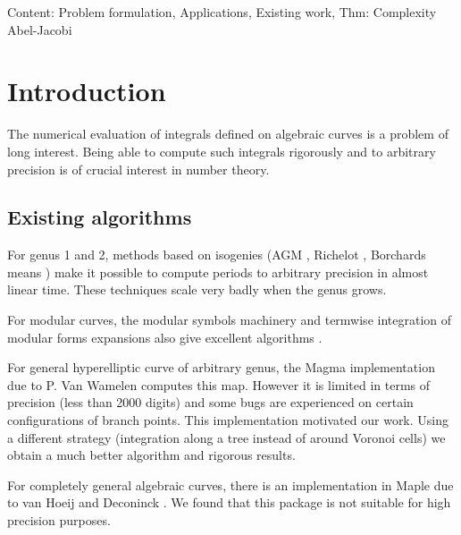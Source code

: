 \documentclass[main.tex]{subfiles}
\begin{document}
  Content: Problem formulation, Applications, Existing work, Thm: Complexity Abel-Jacobi

  \section{Introduction}

  The numerical evaluation of integrals defined on algebraic curves
  is a problem of long interest. Being able to compute such integrals
  rigorously and to arbitrary precision is of crucial interest in
  number theory.

  \subsection{Existing algorithms}

  For genus 1 and 2, methods based on isogenies (AGM \cite{CremonaAGM13},
  Richelot \cite{BostMestre88}, Borchards means \cite{Labrande16})
  make it possible to compute periods to arbitrary precision in almost
  linear time. These techniques scale very badly when the genus grows.

  For modular curves, the modular symbols machinery and termwise integration of
  modular forms expansions also give excellent algorithms
  \cite[sec 3.2]{Mascot13}.

  For general hyperelliptic curve of arbitrary genus, the Magma implementation
  due to P. Van Wamelen \cite{vanWamelen06} computes this map.
  However it is limited in terms of precision (less
  than 2000 digits) and some bugs are experienced on
  certain configurations of branch points. This implementation motivated our
  work. Using a different strategy
  (integration along a tree instead of around Voronoi cells)
  we obtain a much better algorithm and rigorous results.

  For completely general algebraic curves, there is an implementation in Maple
  due to van Hoeij and Deconinck \cite{DeconinckvanHoeij01}.
  We found that this package is not suitable for high precision purposes.
\end{document}
